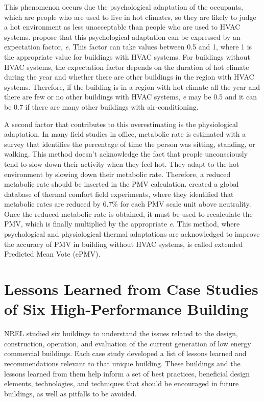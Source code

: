 This phenomenon occurs due the psychological adaptation of the occupants, which are people who are used to live in hot climates, so they are likely to judge a hot environment as less unacceptable than people who are used to HVAC systems. \citep{} propose that this psychological adaptation can be expressed by an expectation factor, \textit{e}. This factor can take values between 0.5 and 1, where 1 is the appropriate value for buildings with HVAC systems. For buildings without HVAC systems, the expectation factor depends on the duration of hot climate during the year and whether there are other buildings in the region with HVAC systems. Therefore, if the building is in a region with hot climate all the year and there are few or no other buildings with HVAC systems, \textit{e} may be 0.5 and it can be 0.7 if there are many other buildings with air-conditioning. 

A second factor that contributes to this overestimating is the physiological adaptation. In many field studies in office, metabolic rate is estimated with a survey that identifies the percentage of time the person was sitting, standing, or walking. This method doesn't acknowledge the fact that people unconsciously tend to slow down their activity when they feel hot. They adapt to the hot environment by slowing down their metabolic rate. Therefore, a reduced metabolic rate should be inserted in the PMV calculation. \cite{} created a global database of thermal comfort field experiments, where they identified that metabolic rates are reduced by 6.7\% for each PMV scale unit above neutrality. Once the reduced metabolic rate is obtained, it must be used to recalculate the PMV, which is finally multiplied by the appropriate \textit{e}. This method, where psychological and physiological thermal adaptations are acknowledged to improve the accuracy of PMV in building without HVAC systems, is called extended Predicted Mean Vote (ePMV).


\section{Lessons Learned from Case Studies of Six High-Performance Building}
NREL studied six buildings to understand the issues related to the design, construction, operation, and evaluation of the current generation of low energy commercial buildings. Each case study developed a list of lessons learned and recommendations relevant to that unique building. These buildings and the lessons learned from them help inform a set of best practices, beneficial design elements, technologies, and techniques that should be encouraged in future buildings, as well as pitfalls to be avoided. 


